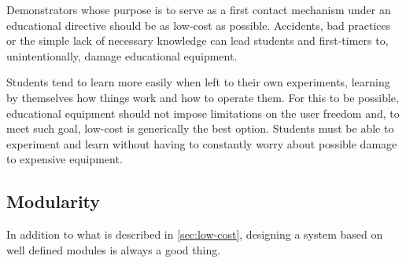 Demonstrators whose purpose is to serve as a first contact mechanism under an educational directive should be as low-cost as possible.
Accidents, bad practices or the simple lack of necessary knowledge can lead students and first-timers to, unintentionally, damage educational equipment.

Students tend to learn more easily when left to their own experiments, learning by themselves how things work and how to operate them. %
For this to be possible, educational equipment should not impose limitations on the user freedom and, to meet such goal, low-cost is generically the best option.
Students must be able to experiment and learn without having to constantly worry about possible damage to expensive equipment.

\subsection{Modularity}

In addition to what is described in \autoref{sec:low-cost}, designing a system based on well defined modules is always a good thing.

